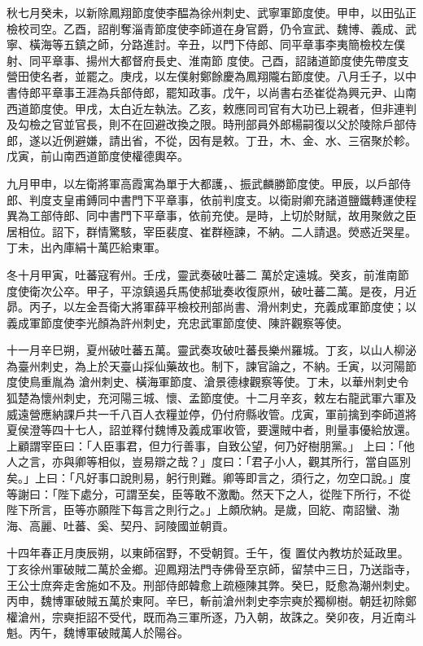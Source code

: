 \begin{pinyinscope}
 秋七月癸未，以新除鳳翔節度使李醖為徐州刺史、武寧軍節度使。甲申，以田弘正檢校司空。乙酉，詔削奪淄青節度使李師道在身官爵，仍令宣武、魏博、義成、武寧、橫海等五鎮之師，分路進討。辛丑，以門下侍郎、同平章事李夷簡檢校左僕射、同平章事、揚州大都督府長史、淮南節
 度使。己酉，詔諸道節度使先帶度支營田使名者，並罷之。庚戌，以左僕射鄭餘慶為鳳翔隴右節度使。八月壬子，以中書侍郎平章事王涯為兵部侍郎，罷知政事。戊午，以尚書右丞崔從為興元尹、山南西道節度使。甲戌，太白近左執法。乙亥，敕應同司官有大功已上親者，但非連判及勾檢之官並官長，則不在回避改換之限。時刑部員外郎楊嗣復以父於陵除戶部侍郎，遂以近例避嫌，請出省，不從，因有是敕。丁丑，木、金、水、三宿聚於軫。
 戊寅，前山南西道節度使權德輿卒。



 九月甲申，以左衛將軍高霞寓為單于大都護，、振武麟勝節度使。甲辰，以戶部侍郎、判度支皇甫鎛同中書門下平章事，依前判度支。以衛尉卿充諸道鹽鐵轉運使程異為工部侍郎、同中書門下平章事，依前充使。是時，上切於財賦，故用聚斂之臣居相位。詔下，群情驚駭，宰臣裴度、崔群極諫，不納。二人請退。熒惑近哭星。丁未，出內庫絹十萬匹給東軍。



 冬十月甲寅，吐蕃寇宥州。壬戌，靈武奏破吐蕃二
 萬於定遠城。癸亥，前淮南節度使衛次公卒。甲子，平涼鎮遏兵馬使郝玼奏收復原州，破吐蕃二萬。是夜，月近昴。丙子，以左金吾衛大將軍薛平檢校刑部尚書、滑州刺史，充義成軍節度使；以義成軍節度使李光顏為許州刺史，充忠武軍節度使、陳許觀察等使。



 十一月辛巳朔，夏州破吐蕃五萬。靈武奏攻破吐蕃長樂州羅城。丁亥，以山人柳泌為臺州刺史，為上於天臺山採仙藥故也。制下，諫官論之，不納。壬寅，以河陽節度使鳥重胤為
 滄州刺史、橫海軍節度、滄景德棣觀察等使。丁未，以華州刺史令狐楚為懷州刺史，充河陽三城、懷、孟節度使。十二月辛亥，敕左右龍武軍六軍及威遠營應納課戶共一千八百人衣糧並停，仍付府縣收管。戊寅，軍前擒到李師道將夏侯澄等四十七人，詔並釋付魏博及義成軍收管，要還賊中者，則量事優給放還。上顧謂宰臣曰：「人臣事君，但力行善事，自致公望，何乃好樹朋黨。」
 上曰：「他人之言，亦與卿等相似，豈易辯之哉？」度曰：「君子小人，觀其所行，當自區別矣。」上曰：「凡好事口說則易，躬行則難。卿等即言之，須行之，勿空口說。」度等謝曰：「陛下處分，可謂至矣，臣等敢不激勵。然天下之人，從陛下所行，不從陛下所言，臣等亦願陛下每言之則行之。」上頗欣納。是歲，回紇、南詔蠻、渤海、高麗、吐蕃、奚、契丹、訶陵國並朝貢。



 十四年春正月庚辰朔，以東師宿野，不受朝賀。壬午，復
 置仗內教坊於延政里。丁亥徐州軍破賊二萬於金鄉。迎鳳翔法門寺佛骨至京師，留禁中三日，乃送詣寺，王公士庶奔走舍施如不及。刑部侍郎韓愈上疏極陳其弊。癸巳，貶愈為潮州刺史。丙申，魏博軍破賊五萬於東阿。辛巳，斬前滄州刺史李宗奭於獨柳樹。朝廷初除鄭權滄州，宗奭拒詔不受代，既而為三軍所逐，乃入朝，故誅之。癸卯夜，月近南斗魁。丙午，魏博軍破賊萬人於陽谷。




\end{pinyinscope}
